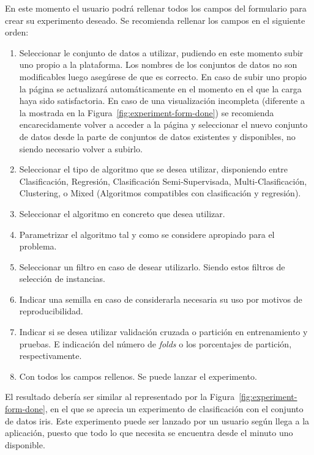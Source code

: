 En este momento el usuario podrá rellenar todos los campos del formulario para crear su experimento deseado. Se recomienda rellenar los campos en el siguiente orden:
\begin{enumerate}
\item Seleccionar le conjunto de datos a utilizar, pudiendo en este momento subir uno propio a la plataforma. Los nombres de los conjuntos de datos no son modificables luego asegúrese de que es correcto. En caso de subir uno propio la página se actualizará automáticamente en el momento en el que la carga haya sido satisfactoria. En caso de una visualización incompleta (diferente a la mostrada en la Figura~\ref{fig:experiment-form-done}) se recomienda encarecidamente volver a acceder a la página y seleccionar el nuevo conjunto de datos desde la parte de conjuntos de datos existentes y disponibles, no siendo necesario volver a subirlo.
\item Seleccionar el tipo de algoritmo que se desea utilizar, disponiendo entre Clasificación, Regresión, Clasificación Semi-Supervisada, Multi-Clasificación, Clustering, o Mixed (Algoritmos compatibles con clasificación y regresión).
\item Seleccionar el algoritmo en concreto que desea utilizar.
\item Parametrizar el algoritmo tal y como se considere apropiado para el problema.
\item Seleccionar un filtro en caso de desear utilizarlo. Siendo estos filtros de selección de instancias.
\item Indicar una semilla en caso de considerarla necesaria su uso por motivos de reproducibilidad.
\item Indicar si se desea utilizar validación cruzada o partición en entrenamiento y pruebas. E indicación del número de \textit{folds} o los porcentajes de partición, respectivamente.
\item Con todos los campos rellenos. Se puede lanzar el experimento.
\end{enumerate}

El resultado debería ser similar al representado por la Figura~\ref{fig:experiment-form-done}, en el que se aprecia un experimento de clasificación con el conjunto de datos iris. Este experimento puede ser lanzado por un usuario según llega a la aplicación, puesto que todo lo que necesita se encuentra desde el minuto uno disponible.


